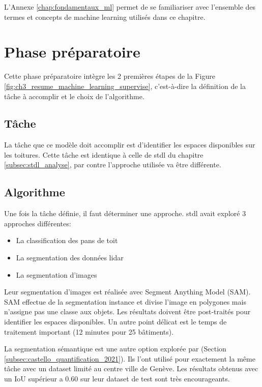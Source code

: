 L'Annexe \ref{chap:fondamentaux_ml} permet de se familiariser avec l'ensemble des termes et concepts de machine learning utilisés dans ce chapitre.

\section{Phase préparatoire}
Cette phase préparatoire intègre les 2 premières étapes de la Figure \ref{fig:ch3_resume_machine_learning_supervise}, c'est-à-dire la définition de la tâche à accomplir et le choix de l'algorithme.

\subsection{Tâche}
La tâche que ce modèle doit accomplir est d'identifier les espaces disponibles sur les toitures. Cette tâche est identique à celle de \acrshort{stdl} du chapitre \ref{subsec:stdl_analyse}, par contre l'approche utilisée va être différente.

\subsection{Algorithme}
Une fois la tâche définie, il faut déterminer une approche. \acrshort{stdl} avait exploré 3 approches différentes:
\begin{itemize}
    \item La classification des pans de toit
    \item La segmentation des données \gls{lidar}
    \item La segmentation d'images
\end{itemize}

Leur segmentation d'images est réalisée avec Segment Anything Model (SAM). SAM effectue de la segmentation instance et divise l'image en polygones mais n'assigne pas une classe aux objets. Les résultats doivent être post-traités pour identifier les espaces disponibles. Un autre point délicat est le temps de traitement important (12 minutes pour 25 bâtiments).

La segmentation sémantique est une autre option explorée par \citeauthor{castello_quantification_2021} (Section \ref{subsec:castello_quantification_2021}). Ils l'ont utilisé pour exactement la même tâche avec un dataset limité au centre ville de Genève. Les résultats obtenus avec un IoU supérieur a 0.60 sur leur dataset de test sont très encourageants.

